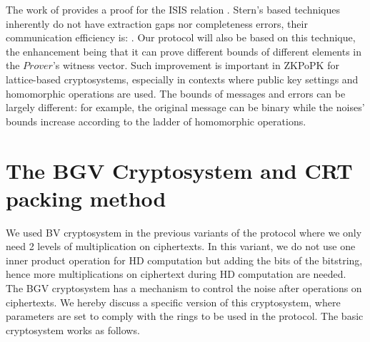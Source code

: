 \begin{description}
  The work of \cite{ling2013improved} provides a proof for the ISIS relation
  .  Stern's based techniques inherently do not have
  extraction gaps nor completeness errors, their communication efficiency is:
  . Our protocol will also be based on this technique, the
  enhancement being that it can prove different bounds of different elements in the
  $Prover$'s witness vector. Such improvement is important in ZKPoPK for
  lattice-based cryptosystems, especially in contexts where public key settings
  and homomorphic operations are used. The bounds of messages and errors can be
  largely different: for example, the original message can be binary while the
  noises' bounds increase according to the ladder of homomorphic operations.

\end{description}




\section{The BGV Cryptosystem and CRT packing method}
\label{sec:6bgv}

We used BV cryptosystem \cite{brakerski2011fully} in the previous variants of
the protocol where we only need 2 levels of multiplication on ciphertexts. In
this variant, we do not use one inner product operation for HD computation but
adding the bits of the bitstring, hence more multiplications on ciphertext
during HD computation are needed. The BGV cryptosystem
\cite{brakerski2014leveled} has a mechanism to control the noise after
operations on ciphertexts. We hereby discuss a specific version of this
cryptosystem, where parameters are set to comply with the rings to be used in
the protocol. The basic cryptosystem works as follows.

